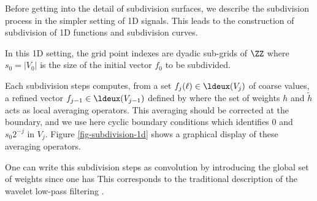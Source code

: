 Before getting into the detail of subdivision surfaces, we describe the subdivision process in the simpler setting of 1D signals. This leads to the construction of subdivision of 1D functions and subdivision curves.  

In this 1D setting, the grid point indexes are dyadic sub-grids of $\ZZ$
where $s_0 = |V_0|$ is the size of the initial vector $f_0$ to be subdivided. 


Each subdivision steps computes, from a set $f_j(\ell) \in \ldeux(V_j)$ of coarse values, a refined vector $f_{j-1} \in \ldeux(V_{j-1})$ defined by
where the set of weights $h$ and $\tilde h$ acts as local averaging operators. 
This averaging should be corrected at the boundary, and we use here cyclic boundary conditions which identifies $0$ and $s_0 2^{-j}$ in $V_j$. Figure \ref{fig-subdivision-1d} shows a graphical display of these averaging operators.

One can write this subdivision steps as convolution by introducing the global set of weights
since one has
This corresponds to the traditional description of the wavelet low-pass filtering \cite{mallat-book}. 



